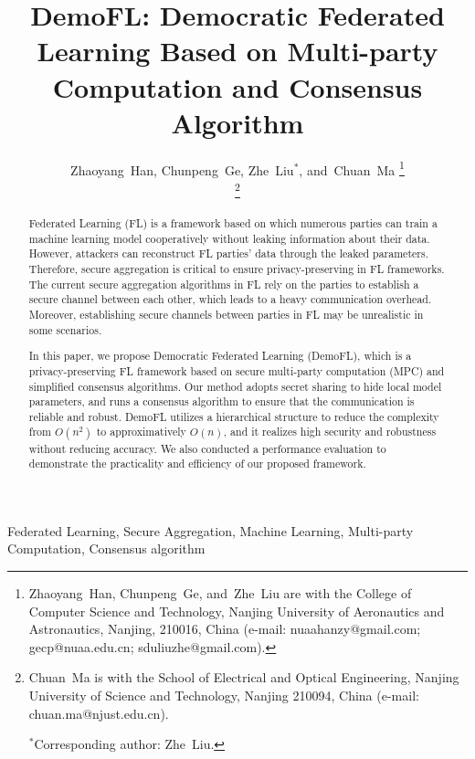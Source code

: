 \documentclass[journal]{IEEEtran}
\begin{document}
\title {DemoFL: Democratic Federated Learning Based on Multi-party Computation and Consensus Algorithm}

\author{Zhaoyang~Han, 
        Chunpeng~Ge, 
        Zhe~Liu$^*$, 
        and~Chuan~Ma%
\thanks{Zhaoyang~Han, Chunpeng~Ge, and~Zhe~Liu are with the College of Computer Science and Technology, Nanjing University of Aeronautics and Astronautics, Nanjing, 210016, China (e-mail: nuaahanzy@gmail.com; gecp@nuaa.edu.cn; sduliuzhe@gmail.com).}

\thanks{Chuan~Ma is with the School of Electrical and Optical Engineering, Nanjing University of Science and Technology, Nanjing 210094, China (e-mail: chuan.ma@njust.edu.cn).

$^*$Corresponding author: Zhe~Liu.}
}

\maketitle

\begin{abstract}
Federated Learning (FL) is a framework based on which numerous parties can train a machine learning model cooperatively without leaking information about their data. However, attackers can reconstruct FL parties' data through the leaked parameters. Therefore, secure aggregation is critical to ensure privacy-preserving in FL frameworks. The current secure aggregation algorithms in FL rely on the parties to establish a secure channel between each other, which leads to a heavy communication overhead. Moreover, establishing secure channels between parties in FL may be unrealistic in some scenarios.

In this paper, we propose Democratic Federated Learning (DemoFL), which is a privacy-preserving FL framework based on secure multi-party computation (MPC) and simplified consensus algorithms. Our method adopts secret sharing to hide local model parameters, and runs a consensus algorithm to ensure that the communication is reliable and robust. DemoFL utilizes a hierarchical structure to reduce the complexity from $O(n^2)$ to approximatively $O(n)$, and it realizes high security and robustness without reducing accuracy. We also conducted a performance evaluation to demonstrate the practicality and efficiency of our proposed framework. 

\end{abstract}

\begin{IEEEkeywords}
    Federated Learning, Secure Aggregation, Machine Learning, Multi-party Computation, Consensus algorithm
\end{IEEEkeywords}
\end{document}
